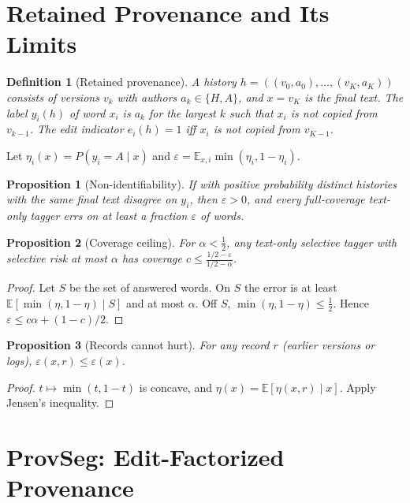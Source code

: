 \documentclass[10pt]{article}
\newtheorem{proposition}{Proposition}
\newtheorem{definition}{Definition}
\begin{document}
\section{Retained Provenance and Its Limits}
\begin{definition}[Retained provenance]
A history $h=((v_0,a_0),\dots,(v_K,a_K))$ consists of versions $v_k$ with authors $a_k\in\{H,A\}$, and $x=v_K$ is the final text. The label $y_i(h)$ of word $x_i$ is $a_k$ for the largest $k$ such that $x_i$ is not copied from $v_{k-1}$. The edit indicator $e_i(h)=1$ iff $x_i$ is not copied from $v_{K-1}$.
\end{definition}
Let $\eta_i(x)=P(y_i=A\mid x)$ and $\varepsilon=\mathbb{E}_{x,i}\min(\eta_i,1-\eta_i)$.

\begin{proposition}[Non-identifiability]\label{prop:nonid}
If with positive probability distinct histories with the same final text disagree on $y_i$, then $\varepsilon>0$, and every full-coverage text-only tagger errs on at least a fraction $\varepsilon$ of words.
\end{proposition}

\begin{proposition}[Coverage ceiling]\label{prop:cov}
For $\alpha<\tfrac12$, any text-only selective tagger with selective risk at most $\alpha$ has coverage $c\le\frac{1/2-\varepsilon}{1/2-\alpha}$.
\end{proposition}
\begin{proof}
Let $S$ be the set of answered words. On $S$ the error is at least $\mathbb{E}[\min(\eta,1-\eta)\mid S]$ and at most $\alpha$. Off $S$, $\min(\eta,1-\eta)\le\tfrac12$. Hence $\varepsilon\le c\alpha+(1-c)/2$.
\end{proof}

\begin{proposition}[Records cannot hurt]\label{prop:records}
For any record $r$ (earlier versions or logs), $\varepsilon(x,r)\le\varepsilon(x)$.
\end{proposition}
\begin{proof}
$t\mapsto\min(t,1-t)$ is concave, and $\eta(x)=\mathbb{E}[\eta(x,r)\mid x]$. Apply Jensen's inequality.
\end{proof}

\section{ProvSeg: Edit-Factorized Provenance}
\end{document}
